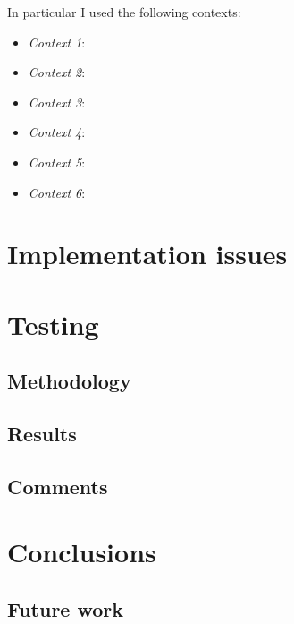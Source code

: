 \documentclass[]{usiinfbachelorproject}
\begin{document}
\noindent In particular I used the following contexts:

\begin{itemize}
	\item \emph{Context 1}: 
	\item \emph{Context 2}:
	\item \emph{Context 3}:
	\item \emph{Context 4}:
	\item \emph{Context 5}:
	\item \emph{Context 6}:
\end{itemize}

\vspace{\fill}

\pagebreak

\section{Implementation issues} \label{issues}


\vspace{\fill}

\pagebreak

\section{Testing} \label{Testing}


\subsection{Methodology}

\subsection{Results}

\subsection{Comments}

\vspace{\fill}

\pagebreak

\section{Conclusions} \label{Conclusions}

\subsection{Future work}

\vspace{\fill}

\pagebreak



\end{document}
